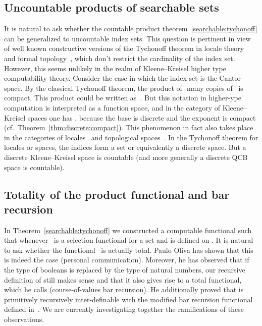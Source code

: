 \documentclass{LMCS}
\begin{document}
\subsection{Uncountable products of searchable sets}

It is natural to ask whether the countable product
theorem~\ref{searchable:tychonoff} can be generalized to uncountable
index sets.  This question is pertinent in view of well known
constructive versions of the Tychonoff theorem in locale
theory~\cite{MR641111} and formal topology~\cite{MR1150923}, which
don't restrict the cardinality of the index set.  However, this seems
unlikely in the realm of Kleene--Kreisel higher type computability
theory.  Consider the case in which the index set is the Cantor space.
By the classical Tychonoff theorem, the product of -many
copies of~ is compact.  This product could be written
as~. But this notation in higher-ype
computation is interpreted as a function space, and in the category of
Kleene--Kreisel spaces one has , because
the base is discrete and the exponent is compact (cf.\
Theorem~\ref{thm:discrete:compact}).  This phenomenon in fact also
takes place in the categories of locales~\cite{hyland:functionspaces}
and topological spaces~\cite{escardo:barbados}. In the Tychonoff
theorem for locales or spaces, the indices form a set or equivalently a
discrete space. But a discrete Kleene--Kreisel space is countable (and
more generally a discrete QCB space is countable).

\subsection{Totality of the product functional and bar recursion}

\newcommand{\CBR}{\operatorname{CBR}}
\newcommand{\MBR}{\operatorname{MBR}} In
Theorem~\ref{searchable:tychonoff} we constructed a computable
functional  such that 
whenever~ is a selection functional for a set  and  is
defined on . It is natural to ask whether the
functional~ is actually total. Paulo Oliva has shown that this is
indeed the case (personal communication). Moreover, he has observed
that if the type of booleans is replaced by the type of natural
numbers, our recursive definition of  still makes sense and that
it also gives rise to a total functional, which he calls 
(course-of-values bar recursion). He additionally proved that 
is primitively recursively inter-definable with the modified bar
recursion functional  defined in~\cite{berger:oliva:mbr}. We are
currently investigating together the ramifications of these
observations.
\end{document}
